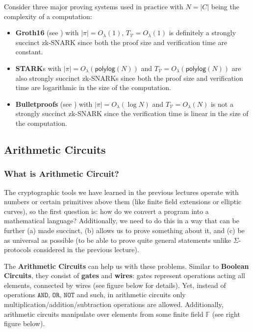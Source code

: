 \documentclass[../lecture-notes-148x210.tex]{subfiles}
\begin{document}
\begin{example}
    Consider three major proving systems used in practice with $N=|C|$ being the complexity of a computation:
    \begin{itemize}
        \item \textbf{Groth16} (see ) with $|\pi| =
        O_{\lambda}(1)$, $T_{\mathcal{V}} = O_{\lambda}(1)$ is definitely a
        strongly succinct zk-SNARK since both the proof size and verification
        time are constant.
        \item \textbf{STARK}s with $|\pi| = O_{\lambda}(\mathsf{polylog}(N))$
        and $T_{\mathcal{V}} = O_{\lambda}(\mathsf{polylog}(N))$ are also
        strongly succinct zk-SNARKs since both the proof size and verification
        time are logarithmic in the size of the computation.
        \item \textbf{Bulletproofs} (see ) with
        $|\pi| = O_{\lambda}(\log N)$ and $T_{\mathcal{V}} = O_{\lambda}(N)$ is
        not a strongly succinct zk-SNARK since the verification time is linear
        in the size of the computation.
    \end{itemize}
\end{example}

\subsection{Arithmetic Circuits}

\subsubsection{What is Arithmetic Circuit?}
The cryptographic tools we have learned in the previous lectures operate with
numbers or certain primitives above them (like finite field extensions or
elliptic curves), so the first question is: how do we convert a program into a
mathematical language? Additionally, we need to do this in a way that can be
further (a) made succinct, (b) allows us to prove something about it, and (c) be
as universal as possible (to be able to prove quite general statements unlike
$\Sigma$-protocols considered in the previous lecture).

The \textbf{Arithmetic Circuits} can help us with these problems. Similar to
\textbf{Boolean Circuits}, they consist of \textbf{gates} and \textbf{wires}:
gates represent operations acting all elements, connected by wires (see figure
below for details). Yet, instead of operations $\mathtt{AND}$, $\mathtt{OR}$,
$\mathtt{NOT}$ and such, in arithmetic circuits only
multiplication/addition/subtraction operations are allowed. Additionally,
arithmetic circuits manipulate over elements from some finite field $\mathbb{F}$
(see right figure below).
\end{document}
